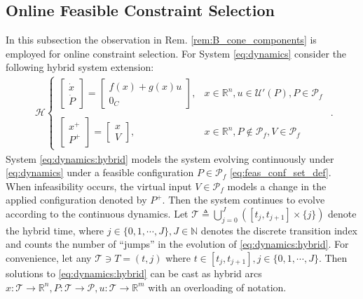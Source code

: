 \documentclass[letterpaper, 10 pt, conference]{ieeeconf}  %
\begin{document}
\subsection{Online Feasible Constraint Selection}
In this subsection the observation in Rem. \ref{rem:B_cone_components} is employed for online constraint selection. For System \eqref{eq:dynamics} consider the following hybrid system extension:
\begin{equation}\label{eq:dynamics:hybrid}
    \begin{split}
        \mathcal{H}
        \begin{cases}
            \begin{bmatrix}
                \dot{x} \\
                \dot{P}
            \end{bmatrix} = 
            \begin{bmatrix}
                f(x) + g(x)u \\
                {0}_C
            \end{bmatrix}, 
            & 
            x\in\mathbb{R}^n, u \in \mathcal{U}'(P),P\in\mathcal{P}_f
            \\ \\
            \begin{bmatrix}
                {x}^+ \\
                {P}^+
            \end{bmatrix} = 
            \begin{bmatrix}
                x \\
                V
            \end{bmatrix},
            & 
            x\in\mathbb{R}^n, P\notin\mathcal{P}_f, V \in \mathcal{P}_f
        \end{cases}
    \end{split}.
\end{equation}
System \eqref{eq:dynamics:hybrid} models the system evolving continuously under \eqref{eq:dynamics} under a feasible configuration $P\in\mathcal{P}_f$ \eqref{eq:feas_conf_set_def}. When infeasibility occurs, the virtual input $V\in\mathcal{P}_f$ models a change in the applied configuration denoted by $P^+$. Then the system continues to evolve according to the continuous dynamics. Let $\mathcal{T} \triangleq \bigcup_{j=0}^{J} \left([t_j,t_{j+1}] \times\{j\} \right)$ denote the hybrid time, where $j\in\{0,1,\cdots,J\},J\in\mathbb{N}$ denotes the discrete transition index and counts the number of ``jumps'' in the evolution of \eqref{eq:dynamics:hybrid}. For convenience, let any $\mathcal{T}\ni T = (t,j)$ where $t\in[t_j,t_{j+1}],j\in\{0,1,\cdots,J\}$. Then solutions to \eqref{eq:dynamics:hybrid} can be cast as hybrid arcs $x:\mathcal{T}\rightarrow\mathbb{R}^n, P:\mathcal{T}\rightarrow\mathcal{P}, u:\mathcal{T}\rightarrow\mathbb{R}^m$ with an overloading of notation. 
\end{document}
